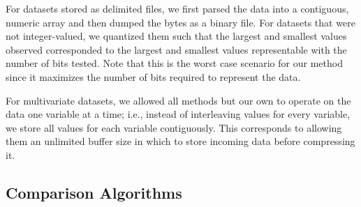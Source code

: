 
For datasets stored as delimited files, we first parsed the data into a contiguous, numeric array and then dumped the bytes as a binary file. For datasets that were not integer-valued, we quantized them such that the largest and smallest values observed corresponded to the largest and smallest values representable with the number of bits tested. Note that this is the worst case scenario for our method since it maximizes the number of bits required to represent the data.

For multivariate datasets, we allowed all methods but our own to operate on the data one variable at a time; i.e., instead of interleaving values for every variable, we store all values for each variable contiguously. This corresponds to allowing them an unlimited buffer size in which to store incoming data before compressing it.


\subsection{Comparison Algorithms}

